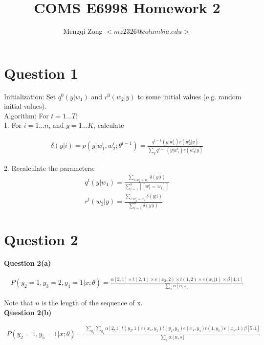 \documentclass[12pt]{article}
\title{COMS E6998 Homework 2}
\author{Mengqi Zong $<mz2326@columbia.edu>$}
\begin{document}
\maketitle

\setlength{\parindent}{0in}

\section*{Question 1}

Initialization: Set $q^0(y|w_1)$ and $r^0(w_2|y)$ to some initial
values (e.g. random initial values). \\

Algorithm: For $t = 1...T$: \\

1. For $i = 1...n$, and $y = 1...K$, calculate

\begin{eqnarray*}
\delta(y|i)
= p(y|w^i_1, w^i_2; \underline {\theta}^{t-1})
= \frac {q^{t-1}(y|w^i_1) r(w^i_2|y)}
{\sum_y {q^{t-1}(y|w^i_1) r(w^i_2|y)}}
\end{eqnarray*}

2. Recalculate the parameters: \\

\begin{eqnarray*}
q^t(y|w_1) = \frac {\sum_{i:w^i_1 = w_1} \delta (y|i)}
{\sum^n_{i=1} [[w^i_1 = w_1]]} \\
r^t(w_2|y) = \frac {\sum_{i:w^i_2 = w_2} \delta (y|i)}
{\sum^n_{i=1} \delta (y|i)}
\end{eqnarray*}

\section*{Question 2}

{\bf Question 2(a)}

\begin{eqnarray*}
P(y_2 = 1, y_3 = 2, y_4 = 1 | x; \theta)
= \frac {\alpha[2,1] \times t(2,1) \times e(x_3,2) \times t(1,2) \times
  e(x_4|1) \times \beta[4,1]} {\sum_s \alpha[n,s]}
\end{eqnarray*}

Note that $n$ is the length of the sequence of x. \\

{\bf Question 2(b)}

\begin{eqnarray*}
P(y_2 = 1, y_5 = 1|x; \theta)
= \frac {\sum_{y_3} \sum_{y_4} \alpha[2,1] t(y_3, 1) e(x_3,y_3) t(y_4,
  y_3) e(x_4, y_4) t(1, y_4) e(x_5, 1) \beta[5, 1]}
{\sum_s \alpha[n, s]}
\end{eqnarray*}
\end{document}
